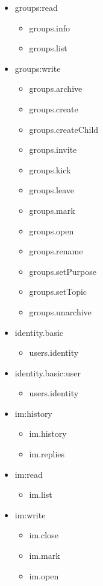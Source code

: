 \begin{multicols}{2}
\begin{itemize}
	\item groups:read
	\begin{itemize}
		\item groups.info
		\item groups.list
	\end{itemize}
	
	\item groups:write
	\begin{itemize}
		\item groups.archive
		\item groups.create
		\item groups.createChild
		\item groups.invite
		\item groups.kick
		\item groups.leave
		\item groups.mark
		\item groups.open
		\item groups.rename
		\item groups.setPurpose
		\item groups.setTopic
		\item groups.unarchive
	\end{itemize}
	
	\item identity.basic
	\begin{itemize}
		\item users.identity
	\end{itemize}
	
	\item identity.basic:user
	\begin{itemize}
		\item users.identity
	\end{itemize}
	
	\item im:history
	\begin{itemize}
		\item im.history
		\item im.replies
	\end{itemize}
	
	\item im:read
	\begin{itemize}
		\item im.list
	\end{itemize}
	
	\item im:write
	\begin{itemize}
		\item im.close
		\item im.mark
		\item im.open
	\end{itemize}
	

\end{itemize}
\end{multicols}
